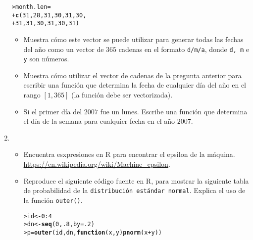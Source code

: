 \documentclass{article}\usepackage[]{graphicx}\usepackage[]{color}
\makeatletter
\newcommand{\hlnum}[1]{\textcolor[rgb]{0.686,0.059,0.569}{#1}}%
\newcommand{\hlopt}[1]{\textcolor[rgb]{0,0,0}{#1}}%
\newcommand{\hlstd}[1]{\textcolor[rgb]{0.345,0.345,0.345}{#1}}%
\newcommand{\hlkwa}[1]{\textcolor[rgb]{0.161,0.373,0.58}{\textbf{#1}}}%
\newcommand{\hlkwb}[1]{\textcolor[rgb]{0.69,0.353,0.396}{#1}}%
\newcommand{\hlkwc}[1]{\textcolor[rgb]{0.333,0.667,0.333}{#1}}%
\newcommand{\hlkwd}[1]{\textcolor[rgb]{0.737,0.353,0.396}{\textbf{#1}}}%
\newenvironment{kframe}{%
 \def\at@end@of@kframe{}%
 \ifinner\ifhmode%
  \def\at@end@of@kframe{\end{minipage}}%
  \begin{minipage}{\columnwidth}%
 \fi\fi%
 \def\FrameCommand##1{\hskip\@totalleftmargin \hskip-\fboxsep
 \colorbox{shadecolor}{##1}\hskip-\fboxsep
     \hskip-\linewidth \hskip-\@totalleftmargin \hskip\columnwidth}%
 \MakeFramed {\advance\hsize-\width
   \@totalleftmargin\z@ \linewidth\hsize
   \@setminipage}}%
 {\par\unskip\endMakeFramed%
 \at@end@of@kframe}
\newenvironment{knitrout}{}{} %
\makeatother
\begin{document}
\begin{enumerate}
\begin{knitrout}
\color{fgcolor}\begin{kframe}
\begin{alltt}
\hlstd{> }\hlstd{month.len} \hlkwb{=}
\hlstd{+ }\hlkwd{c}\hlstd{(}\hlnum{31}\hlstd{,} \hlnum{28}\hlstd{,} \hlnum{31}\hlstd{,} \hlnum{30}\hlstd{,} \hlnum{31}\hlstd{,} \hlnum{30}\hlstd{,}
\hlstd{+ }\hlnum{31}\hlstd{,} \hlnum{31}\hlstd{,} \hlnum{30}\hlstd{,} \hlnum{31}\hlstd{,} \hlnum{30}\hlstd{,} \hlnum{31}\hlstd{)}
\end{alltt}
\end{kframe}
\end{knitrout}
\begin{itemize}
\item 
Muestra c\'omo este vector se puede utilizar para generar todas las fechas del a\~no como un vector de $365$  cadenas en el formato \texttt{d/m/a}, donde \texttt{d, m} e \texttt{y} son n\'umeros.
\item Muestra c\'omo utilizar el vector de cadenas de la pregunta anterior para escribir una funci\'on que determina la fecha de  cualquier d\'ia del a\~no en el rango $[1, 365]$ (la funci\'on debe ser vectorizada).
\item Si el  primer d\'ia del $2007$ fue un lunes. Escribe una funci\'on que determina el d\'ia de la
semana para cualquier fecha en el a\~no $2007$.
\end{itemize}
\item 
\begin{itemize}
\item Encuentra esxpresiones en R para encontrar el epsilon de la m\'aquina. \url{https://en.wikipedia.org/wiki/Machine_epsilon}.
\item Reproduce el siguiente c\'odigo fuente en R, para mostrar  la siguiente  tabla de probabilidad de la \texttt{distribuci\'on est\'andar normal}. Explica el uso de la funci\'on \texttt{outer()}.
\begin{knitrout}
\color{fgcolor}\begin{kframe}
\begin{alltt}
\hlstd{> }\hlstd{id} \hlkwb{<-} \hlnum{0}\hlopt{:}\hlnum{4}
\hlstd{> }\hlstd{dn} \hlkwb{<-} \hlkwd{seq}\hlstd{(}\hlnum{0}\hlstd{,} \hlnum{.8}\hlstd{,} \hlkwc{by} \hlstd{=}\hlnum{.2}\hlstd{)}
\hlstd{> }\hlstd{p} \hlkwb{=} \hlkwd{outer}\hlstd{(id, dn,} \hlkwa{function}\hlstd{(}\hlkwc{x}\hlstd{,}\hlkwc{y}\hlstd{)} \hlkwd{pnorm}\hlstd{(x} \hlopt{+} \hlstd{y))}

\end{alltt}
\end{kframe}
\end{knitrout}
\end{itemize}
\end{enumerate}
\end{document}
